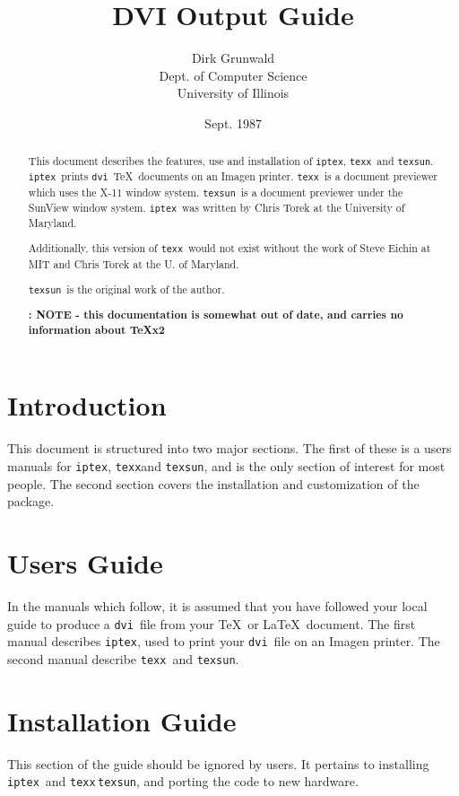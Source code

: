 %
\newcommand{\texx}{{\tt texx}}
\newcommand{\texsun}{{\tt texsun}}
\newcommand{\dvi}{{\tt dvi}}
\newcommand{\iptex}{{\tt iptex}}
%
\title{DVI Output Guide}
\author{
Dirk Grunwald \\
Dept. of Computer Science\\
University of Illinois
}
\date{Sept. 1987}
%

\maketitle
\begin{abstract}
This document describes the features, use and installation of
\iptex, \texx\  and \texsun.
\iptex\ prints \dvi\ \TeX\ documents on an Imagen printer.
\texx\ is a document previewer which uses the X-11 window system.
\texsun\ is a document previewer under the SunView window system.
\iptex\ was written by Chris Torek at the University of Maryland.

Additionally, this version of \texx\ would not exist without the work of
Steve Eichin at MIT and Chris Torek at the U. of Maryland.

\texsun\ is the original work of the author.

{\bf: NOTE - this documentation is somewhat out of date, and carries no
information about TeXx2}
\end{abstract}
%
\section{Introduction}
This document is structured into two major sections.
The first of these is a users manuals for \iptex, \texx and \texsun,
and is the only section of interest for most people.
The second section covers the installation and customization of
the package.

\section{Users Guide}
In the manuals which follow, it is assumed that you have followed your
local guide to produce a \dvi\ file from your \TeX\ or \LaTeX\ document.
The first manual describes \iptex, used to print your \dvi\ file
on an Imagen printer.
The second manual describe \texx\ and \texsun.



\newpage
\section{Installation Guide}
This section of the guide should be ignored by users.
It pertains to installing \iptex\ and \texx\,\texsun, and porting
the code to new hardware.


